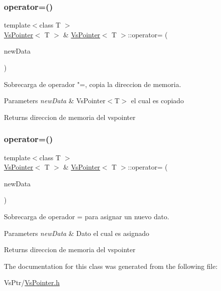 \subsubsection{\texorpdfstring{operator=()}{operator=()}\hspace{0.1cm}{\footnotesize\ttfamily [1/2]}}
{\footnotesize\ttfamily template$<$class T $>$ \\
\hyperlink{class_vs_pointer}{Vs\+Pointer}$<$ T $>$ \& \hyperlink{class_vs_pointer}{Vs\+Pointer}$<$ T $>$\+::operator= (\begin{DoxyParamCaption}\item[{\hyperlink{class_vs_pointer}{Vs\+Pointer}$<$ T $>$}]{new\+Data }\end{DoxyParamCaption})}



Sobrecarga de operador "=\textquotesingle{}, copia la direccion de memoria. 


\begin{DoxyParams}{Parameters}
{\em new\+Data} & Vs\+Pointer$<$\+T$>$ el cual es copiado \\
\hline
\end{DoxyParams}
\begin{DoxyReturn}{Returns}
direccion de memoria del vspointer 
\end{DoxyReturn}
\mbox{\label{class_vs_pointer_af254cb1b44d921143343865939a8ed8d}} 
\subsubsection{\texorpdfstring{operator=()}{operator=()}\hspace{0.1cm}{\footnotesize\ttfamily [2/2]}}
{\footnotesize\ttfamily template$<$class T $>$ \\
\hyperlink{class_vs_pointer}{Vs\+Pointer}$<$ T $>$ \& \hyperlink{class_vs_pointer}{Vs\+Pointer}$<$ T $>$\+::operator= (\begin{DoxyParamCaption}\item[{T}]{new\+Data }\end{DoxyParamCaption})}



Sobrecarga de operador = para asignar un nuevo dato. 


\begin{DoxyParams}{Parameters}
{\em new\+Data} & Dato el cual es asignado \\
\hline
\end{DoxyParams}
\begin{DoxyReturn}{Returns}
direccion de memoria del vspointer 
\end{DoxyReturn}


The documentation for this class was generated from the following file\+:\begin{DoxyCompactItemize}
\item 
Vs\+Ptr/\hyperlink{_vs_pointer_8h}{Vs\+Pointer.\+h}\end{DoxyCompactItemize}
